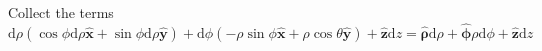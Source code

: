 \documentclass[12pt,a4paper]{article}
\begin{document}
\begin{enumerate}
Collect the terms
\begin{equation}
	\mathrm d\rho(\cos\phi\mathrm d \rho \mathbf{\hat x} + \sin\phi \mathrm d \rho \mathbf{\hat y}) + \mathrm d \phi(-\rho\sin\phi \mathbf{\hat x} + \rho\cos\theta \mathbf{\hat y}) + \mathbf{\hat z}\mathrm dz
	= \mathbf{\hat \rho} \mathrm d\rho + \mathbf{\hat \phi} \rho \mathrm d \phi + \mathbf{\hat z} \mathrm dz
\end{equation}












\end{enumerate}
\end{document}
